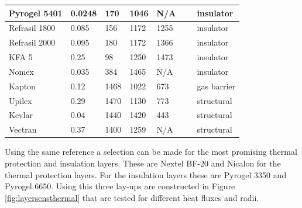 \begin{table}[H]
\begin{tabular}{|l|l|l|l|l|l|l|}
		Pyrogel 5401      & 0.0248                                                & 170                                        & 1046                                            & N/A  	 & ~          & insulator                                 \\ \hline
		Refrasil 1800      & 0.085                                                 & 156                                        & 1172                                            & 1255 	 & ~           & insulator                                \\ \hline
		Refrasil 2000      & 0.095                                                 & 180                                        & 1172                                            & 1366 	 & ~            & insulator                               \\ \hline
		KFA 5             & 0.25                                                  & 98                                         & 1250                                            & 1473 	 & ~        & insulator                                   \\ \hline
		Nomex             & 0.035                                                  & 384                                         & 1465                                            & N/A 	 & ~        & insulator                                   \\ \hline
		Kapton            & 0.12                                                  & 1468                                       & 1022                                            & 673	 & ~            & gas barrier                              \\ \hline
		Upilex            & 0.29                                                  & 1470                                       & 1130                                            & 773 	 & ~             & structural                            \\ \hline
		Kevlar            & 0.04 & 1440                                       & 1420                                            & 443 	 & ~             & structural                            \\ \hline
		Vectran            & 0.37 & 1400 & 1259 & N/A 	 &  & structural                            \\ \hline
	\end{tabular}
	\label{tab:tpsmatprop}
\end{table}

Using the same reference a selection can be made for the most promising thermal protection and insulation layers. These are Nextel BF-20 and Nicalon for the thermal protection layers. For the insulation layers these are Pyrogel 3350 and Pyrogel 6650. Using this three lay-ups are constructed in Figure \ref{fig:layersensthermal} that are tested for different heat fluxes and radii.


